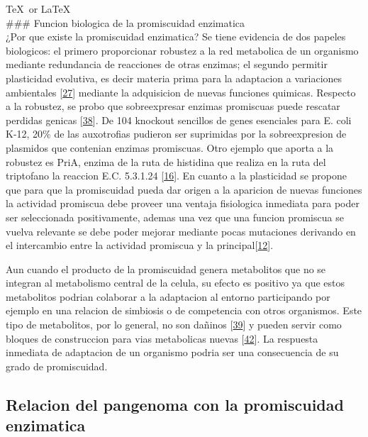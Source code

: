 \documentclass[12pt,twoside]{reedthesis}
\begin{document}
  \TeX~or \LaTeX~\\
  \#\#\# Funcion biologica de la promiscuidad enzimatica\\
  ¿Por que existe la promiscuidad enzimatica? Se tiene evidencia de dos
  papeles biologicos: el primero proporcionar robustez a la red metabolica
  de un organismo mediante redundancia de reacciones de otras enzimas; el
  segundo permitir plasticidad evolutiva, es decir materia prima para la
  adaptacion a variaciones ambientales
  {[}\protect\hyperlink{ref-aharoni_evolvability_2005}{27}{]} mediante la
  adquisicion de nuevas funciones quimicas. Respecto a la robustez, se
  probo que sobreexpresar enzimas promiscuas puede rescatar perdidas
  genicas {[}\protect\hyperlink{ref-patrick_multicopy_2007}{38}{]}. De 104
  knockout sencillos de genes esenciales para E. coli K-12, 20\% de las
  auxotrofias pudieron ser suprimidas por la sobreexpresion de plasmidos
  que contenian enzimas promiscuas. Otro ejemplo que aporta a la robustez
  es PriA, enzima de la ruta de histidina que realiza en la ruta del
  triptofano la reaccion E.C. 5.3.1.24
  {[}\protect\hyperlink{ref-baronagomez_occurrence_2003}{16}{]}. En cuanto
  a la plasticidad se propone que para que la promiscuidad pueda dar
  origen a la aparicion de nuevas funciones la actividad promiscua debe
  proveer una ventaja fisiologica inmediata para poder ser seleccionada
  positivamente, ademas una vez que una funcion promiscua se vuelva
  relevante se debe poder mejorar mediante pocas mutaciones derivando en
  el intercambio entre la actividad promiscua y la
  principal{[}\protect\hyperlink{ref-khersonsky_enzyme_2010}{12}{]}.
  
  Aun cuando el producto de la promiscuidad genera metabolitos que no se
  integran al metabolismo central de la celula, su efecto es positivo ya
  que estos metabolitos podrian colaborar a la adaptacion al entorno
  participando por ejemplo en una relacion de simbiosis o de competencia
  con otros organismos. Este tipo de metabolitos, por lo general, no son
  dañinos {[}\protect\hyperlink{ref-notebaart_network-level_2014}{39}{]} y
  pueden servir como bloques de construccion para vias metabolicas nuevas
  {[}\protect\hyperlink{ref-ma_unconventional_2013}{42}{]}. La respuesta
  inmediata de adaptacion de un organismo podria ser una consecuencia de
  su grado de promiscuidad.
  
  \subsection{Relacion del pangenoma con la promiscuidad
  enzimatica}\label{relacion-del-pangenoma-con-la-promiscuidad-enzimatica}
  
\end{document}

